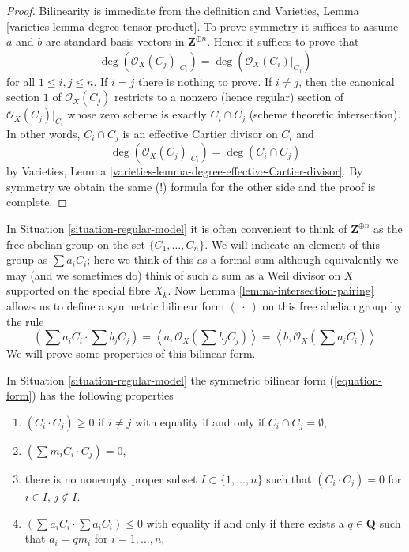 \begin{proof}
Bilinearity is immediate from the definition and
Varieties, Lemma \ref{varieties-lemma-degree-tensor-product}.
To prove symmetry it suffices to assume $a$ and $b$ are
standard basis vectors in $\mathbf{Z}^{\oplus n}$.
Hence it suffices to prove that
$$
\deg(\mathcal{O}_X(C_j)|_{C_i}) = \deg(\mathcal{O}_X(C_i)|_{C_j})
$$
for all $1 \leq i, j \leq n$. If $i = j$ there is nothing to prove.
If $i \not = j$, then the canonical section $1$ of $\mathcal{O}_X(C_j)$
restricts to a nonzero (hence regular) section of $\mathcal{O}_X(C_j)|_{C_i}$
whose zero scheme is exactly $C_i \cap C_j$ (scheme theoretic intersection).
In other words, $C_i \cap C_j$ is an effective Cartier divisor on $C_i$
and
$$
\deg(\mathcal{O}_X(C_j)|_{C_i}) = \deg(C_i \cap C_j)
$$
by Varieties, Lemma \ref{varieties-lemma-degree-effective-Cartier-divisor}.
By symmetry we obtain the same (!) formula for the other side
and the proof is complete.
\end{proof}

\noindent
In Situation \ref{situation-regular-model} it is often convenient to think
of $\mathbf{Z}^{\oplus n}$ as the free abelian group on the set
$\{C_1, \ldots, C_n\}$. We will indicate an element of this group
as $\sum a_i C_i$; here we think of this as a formal sum although
equivalently we may (and we sometimes do)
think of such a sum as a Weil divisor on $X$
supported on the special fibre $X_k$. Now
Lemma \ref{lemma-intersection-pairing}
allows us to define a symmetric bilinear form $(\ \cdot\ )$
on this free abelian group by the rule
\begin{equation}
\label{equation-form}
\left(\sum a_i C_i \cdot \sum b_j C_j\right) =
\left\langle a, \mathcal{O}_X(\sum b_j C_j) \right\rangle =
\left\langle b, \mathcal{O}_X(\sum a_i C_i) \right\rangle
\end{equation}
We will prove some properties of this bilinear form.

\begin{lemma}
\label{lemma-properties-form}
In Situation \ref{situation-regular-model} the symmetric bilinear form
(\ref{equation-form}) has the following properties
\begin{enumerate}
\item $(C_i \cdot C_j) \geq 0$ if $i \not = j$ with equality if and only
if $C_i \cap C_j = \emptyset$,
\item $(\sum m_i C_i \cdot C_j) = 0$,
\item there is no nonempty proper subset $I \subset \{1, \ldots, n\}$
such that $(C_i \cdot C_j) = 0$ for $i \in I$, $j \not \in I$.
\item $(\sum a_i C_i \cdot \sum a_i C_i) \leq 0$ with equality if and
only if there exists a $q \in \mathbf{Q}$ such that $a_i = qm_i$
for $i = 1, \ldots, n$,
\end{enumerate}
\end{lemma}

